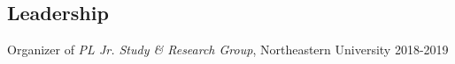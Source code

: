 \documentclass[margin,line]{resume}
\begin{document}
\begin{resume}
    \section{\mysidestyle Leadership} 
     Organizer of \emph{PL Jr. Study \& Research Group}, Northeastern University \hfill 2018-2019

    \newpage




\end{resume}
\end{document}
